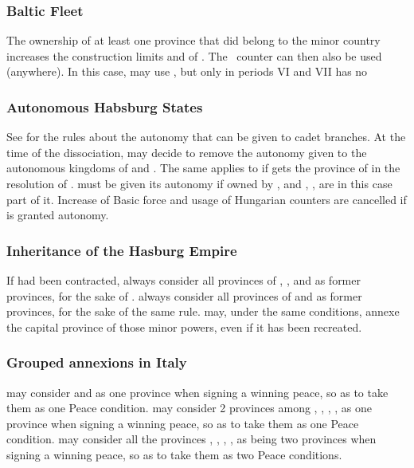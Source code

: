 \subsubsection{Baltic Fleet}\label{chSpecific:Austria:Baltic Fleet}
\aparag The ownership of at least one province that did belong to the
 minor country increases the construction limits and
 of \AUS.
\bparag The \AUS\ \FLEET counter can then also be used (anywhere).
\bparag In this case, \AUS may use \TradeFLEET, but only in periods VI
and VII
\aparag \AUS has no \CTZ

\subsubsection{Autonomous Habsburg States}
\aparag See  for the rules about
the autonomy that can be given to cadet branches.
\aparag At the time of the dissociation, \HAB may decide to remove the
autonomy given to the autonomous kingdoms of  and
. The same applies to  if \HAB gets the
province of  in the resolution of
.
\aparag[Sicilia]  must be given its autonomy if owned by \HAB, and
, ,  are in this
case part of it.
\aparag[Hungary] Increase of Basic force and usage of Hungarian counters
are cancelled if  is granted autonomy.

\subsubsection{Inheritance of the Hasburg Empire}
\aparag If  had been contracted, \HAB
always consider all provinces of ,
,  and
 as former provinces, for the sake of
.
\aparag \HAB  always consider all provinces of  
and  as  former
provinces, for the sake of the same rule.
\aparag \HAB may, under the same conditions, annexe the capital province of
those minor powers, even if it has been recreated.

\subsubsection{Grouped annexions in Italy}
\aparag \HAB may consider  and 
as one province when signing a winning peace, so as to take them as one
Peace condition.
\aparag \HAB may consider 2 provinces among ,
, , ,
 as one province when signing a winning peace, so as
to take them as one Peace condition.
\aparag \HAB may consider all the provinces ,
, , ,
 as being two provinces when signing a winning peace,
so as to take them as two Peace conditions.



